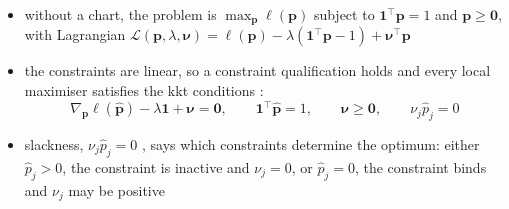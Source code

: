 \begin{itemize}
  \item without a chart, the problem is \(\max_{\boldsymbol{p}}\ell(\boldsymbol{p})\) subject to \(\mathbf{1}^{\top}\boldsymbol{p}=1\) and
        \(\boldsymbol{p}\ge\boldsymbol{0}\), with Lagrangian
        \(\mathcal{L}(\boldsymbol{p},\lambda,\boldsymbol{\nu})=\ell(\boldsymbol{p})-\lambda(\mathbf{1}^{\top}\boldsymbol{p}-1)+\boldsymbol{\nu}^{\top}\boldsymbol{p}\)
  \item the constraints are linear, so a constraint qualification holds and every local maximiser satisfies
        the \gls{kkt} conditions \cite{boydConvexOptimization2004}:
        \begin{equation}
          \nabla_{\boldsymbol{p}}\ell(\hat{\boldsymbol{p}})-\lambda\mathbf{1}+\boldsymbol{\nu}=\boldsymbol{0},
          \qquad
          \mathbf{1}^{\top}\hat{\boldsymbol{p}}=1,
          \qquad
          \boldsymbol{\nu}\ge\boldsymbol{0},
          \qquad
          \nu_{j}\hat p_{j}=0
          \label{eq-kkt}
        \end{equation}
  \item \gls{slackness}, \(\nu_{j}\hat p_{j}=0\) \cite{boydConvexOptimization2004}, says which constraints determine the optimum: either
        \(\hat p_{j}>0\), the constraint is inactive and \(\nu_{j}=0\), or \(\hat p_{j}=0\), the constraint binds and
        \(\nu_{j}\) may be positive


\end{itemize}
